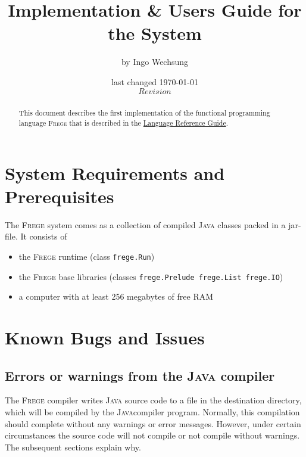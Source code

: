 \documentclass[a4paper]{report}
\date{last changed \today{} \\ $Revision$}
\author{\small{by Ingo Wechsung}}
\title{Implementation \& Users Guide for the \frege{} System}
\newcommand{\frege}[0]{\textsc{Frege}}
\newcommand{\java}{\textsc{Java}}
\begin{document}
\maketitle

\begin{abstract}

This document describes the first implementation of
the functional programming language \frege{}
that is described in
the \href{file:./Language.pdf}{Language Reference Guide}.


\end{abstract}

\tableofcontents

\listoffigures

\chapter{System Requirements and Prerequisites}

The \frege{} system comes as a collection of compiled \java{} classes packed in a jar-file.
It consists of 
\begin{itemize}
\item the \frege{} runtime (class {\tt frege.Run})
\item the \frege{} base libraries (classes {\tt frege.Prelude frege.List frege.IO})
\end{itemize}

\begin{itemize}
\item a computer with at least 256 megabytes of free RAM
\end{itemize}


\chapter{Known Bugs and Issues}

\section{Errors or warnings from the \java{} compiler}

The \frege{} compiler writes \java{} source code to a file in the destination directory,
which will be compiled by the \java compiler program. Normally, this compilation
should complete without any warnings or error messages. However, under certain circumstances
the source code will not compile or not compile without warnings. The subsequent
sections explain why.
\end{document}
